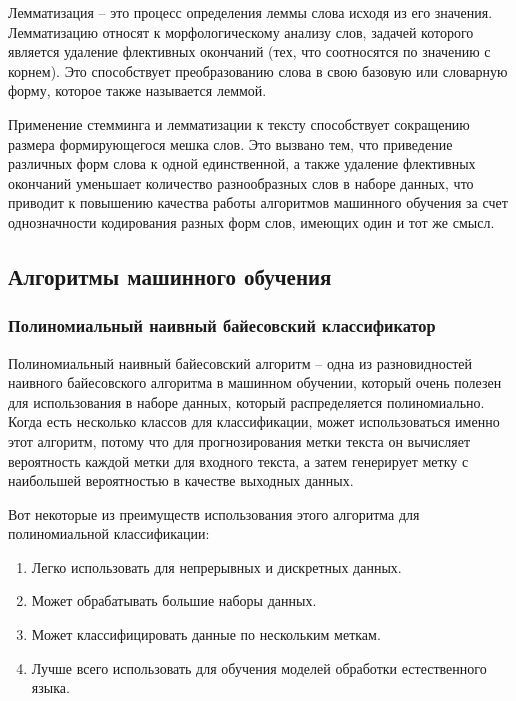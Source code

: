\documentclass[bachelor, och, coursework]{SCWorks}
\begin{document}
            Лемматизация – это процесс определения леммы слова исходя из его
            значения. Лемматизацию относят к морфологическому анализу слов,
            задачей которого является удаление флективных окончаний (тех, что
            соотносятся по значению с корнем). Это способствует преобразованию
            слова в свою базовую или словарную форму, которое также называется
            леммой.

            Применение стемминга и лемматизации к тексту способствует сокращению
            размера формирующегося мешка слов. Это вызвано тем, что приведение
            различных форм слова к одной единственной, а также удаление
            флективных окончаний уменьшает количество разнообразных слов в
            наборе данных, что приводит к повышению качества работы алгоритмов
            машинного обучения за счет однозначности кодирования разных форм
            слов, имеющих один и тот же смысл.
            

    \subsection{Алгоритмы машинного обучения}
        \subsubsection{Полиномиальный наивный байесовский классификатор}
            

            Полиномиальный наивный байесовский алгоритм – одна из разновидностей
            наивного байесовского алгоритма в машинном обучении, который очень
            полезен для использования в наборе данных, который распределяется
            полиномиально. Когда есть несколько классов для классификации, может
            использоваться именно этот алгоритм, потому что для прогнозирования
            метки текста он вычисляет вероятность каждой метки для входного
            текста, а затем генерирует метку с наибольшей вероятностью в
            качестве выходных данных.

            Вот некоторые из преимуществ использования этого алгоритма для
            полиномиальной классификации:

                \begin{enumerate}
                    \item Легко использовать для непрерывных и дискретных
                    данных.
                    \item Может обрабатывать большие наборы данных.
                    \item Может классифицировать данные по нескольким меткам.
                    \item Лучше всего использовать для обучения моделей
                    обработки естественного языка.
                \end{enumerate}
\end{document}
